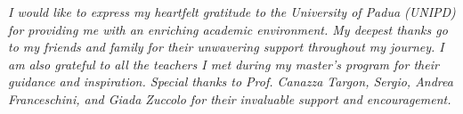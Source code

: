 
\textit{I would like to express my heartfelt gratitude to the University of Padua (UNIPD) for providing me with an enriching academic environment. My deepest thanks go to my friends and family for their unwavering support throughout my journey. I am also grateful to all the teachers I met during my master's program for their guidance and inspiration. Special thanks to Prof. Canazza Targon, Sergio, Andrea Franceschini, and Giada Zuccolo for their invaluable support and encouragement.}